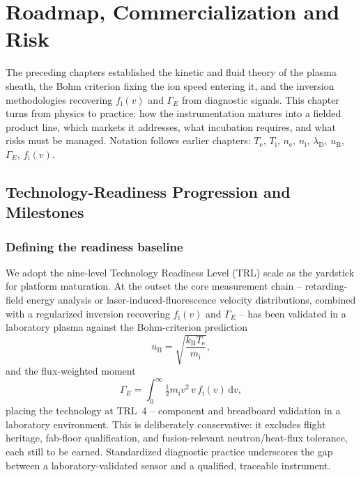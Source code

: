 \chapter{Roadmap, Commercialization and Risk}
\label{ch:roadmap}

The preceding chapters established the kinetic and fluid theory of the plasma sheath, the Bohm criterion fixing the ion speed entering it, and the inversion methodologies recovering $f_{\mathrm{i}}(v)$ and $\Gamma_{E}$ from diagnostic signals. This chapter turns from physics to practice: how the instrumentation matures into a fielded product line, which markets it addresses, what incubation requires, and what risks must be managed. Notation follows earlier chapters: $T_{\mathrm{e}}$, $T_{\mathrm{i}}$, $n_{\mathrm{e}}$, $n_{\mathrm{i}}$, $\lambda_{\mathrm{D}}$, $u_{\mathrm{B}}$, $\Gamma_{E}$, $f_{\mathrm{i}}(v)$.

\section{Technology-Readiness Progression and Milestones}
\label{sec:trl}

\subsection{Defining the readiness baseline}

We adopt the nine-level Technology Readiness Level (TRL) scale as the yardstick for platform maturation. At the outset the core measurement chain -- retarding-field energy analysis or laser-induced-fluorescence velocity distributions, combined with a regularized inversion recovering $f_{\mathrm{i}}(v)$ and $\Gamma_{E}$ -- has been validated in a laboratory plasma against the Bohm-criterion prediction
\begin{equation}
u_{\mathrm{B}} = \sqrt{\frac{k_{\mathrm{B}} T_{\mathrm{e}}}{m_{\mathrm{i}}}},
\label{eq:bohm-roadmap}
\end{equation}
and the flux-weighted moment
\begin{equation}
\Gamma_{E} = \int_{0}^{\infty} \tfrac{1}{2} m_{\mathrm{i}} v^{2}\, v\, f_{\mathrm{i}}(v)\, \mathrm{d}v,
\label{eq:gammaE-roadmap}
\end{equation}
placing the technology at TRL~4 -- component and breadboard validation in a laboratory environment. This is deliberately conservative: it excludes flight heritage, fab-floor qualification, and fusion-relevant neutron/heat-flux tolerance, each still to be earned. Standardized diagnostic practice \cite{ref0490} underscores the gap between a laboratory-validated sensor and a qualified, traceable instrument.

